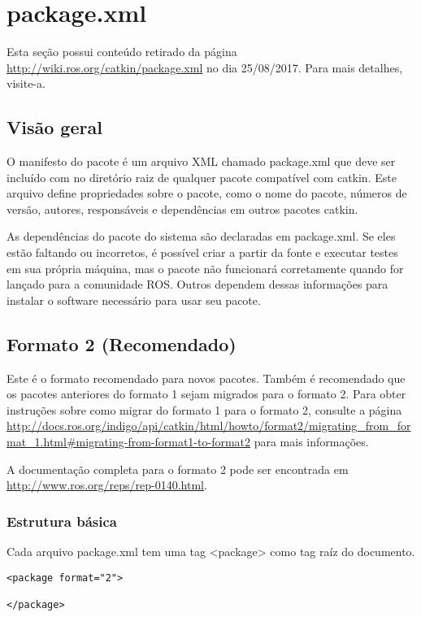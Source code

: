 \chapter{package.xml}
\label{package}

Esta seção possui conteúdo retirado da página \url{http://wiki.ros.org/catkin/package.xml} no dia 25/08/2017. Para mais detalhes, visite-a.

\section{Visão geral}

O manifesto do pacote é um arquivo XML chamado package.xml que deve ser incluído com no diretório raiz de qualquer pacote compatível com catkin. Este arquivo define propriedades sobre o pacote, como o nome do pacote, números de versão, autores, responsáveis e dependências em outros pacotes catkin.

As dependências do pacote do sistema são declaradas em package.xml. Se eles estão faltando ou incorretos, é possível criar a partir da fonte e executar testes em sua própria máquina, mas o pacote não funcionará corretamente quando for lançado para a comunidade ROS. Outros dependem dessas informações para instalar o software necessário para usar seu pacote.

\section{Formato 2 (Recomendado)}

Este é o formato recomendado para novos pacotes. Também é recomendado que os pacotes anteriores do formato 1 sejam migrados para o formato 2. Para obter instruções sobre como migrar do formato 1 para o formato 2, consulte a página \url{http://docs.ros.org/indigo/api/catkin/html/howto/format2/migrating_from_format_1.html#migrating-from-format1-to-format2} para mais informações.

A documentação completa para o formato 2 pode ser encontrada em \url{http://www.ros.org/reps/rep-0140.html}. 

\subsection{Estrutura básica}

Cada arquivo package.xml tem uma tag <package> como tag raíz do documento.

\begin{verbatim}
<package format="2">

</package>
\end{verbatim}

